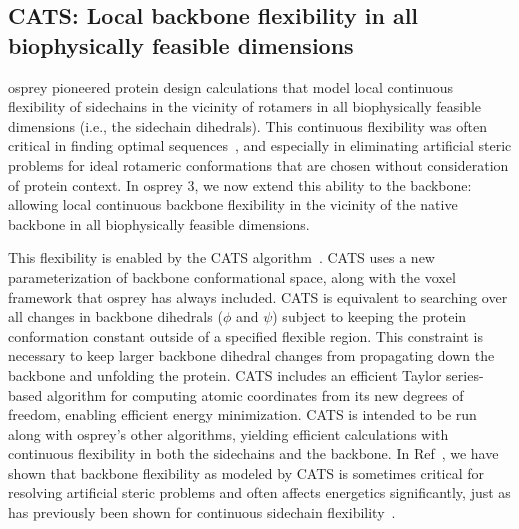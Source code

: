 \subsection{CATS: Local backbone flexibility in all biophysically feasible dimensions}

{\sc osprey} pioneered protein design calculations that model local continuous flexibility of sidechains in the vicinity of rotamers in all biophysically feasible dimensions (i.e., the sidechain dihedrals).  This continuous flexibility was often critical in finding optimal sequences~\cite{iMinDEE}, and especially in eliminating artificial steric problems for ideal rotameric conformations that are chosen without consideration of protein context.  In {\sc osprey} 3, we now extend this ability to the backbone: allowing local continuous backbone flexibility in the vicinity of the native backbone in all biophysically feasible dimensions.  

This flexibility is enabled by the CATS algorithm~\cite{CATS}.  CATS uses a new parameterization of backbone conformational space, along with the voxel framework that {\sc osprey} has always included.  CATS is equivalent to searching over all changes in backbone dihedrals ($\phi$ and $\psi$) subject to keeping the protein conformation constant outside of a specified flexible region.  This constraint is necessary to keep larger backbone dihedral changes from propagating down the backbone and unfolding the protein. CATS includes an efficient Taylor series-based algorithm for computing atomic coordinates from its new degrees of freedom, enabling efficient energy minimization.  CATS is intended to be run along with {\sc osprey}'s other algorithms, yielding efficient calculations with continuous flexibility in both the sidechains and the backbone.  In Ref~, we have shown that backbone flexibility as modeled by CATS is sometimes critical for resolving artificial steric problems and often affects energetics significantly, just as has previously been shown for continuous sidechain flexibility~\cite{iMinDEE}.  